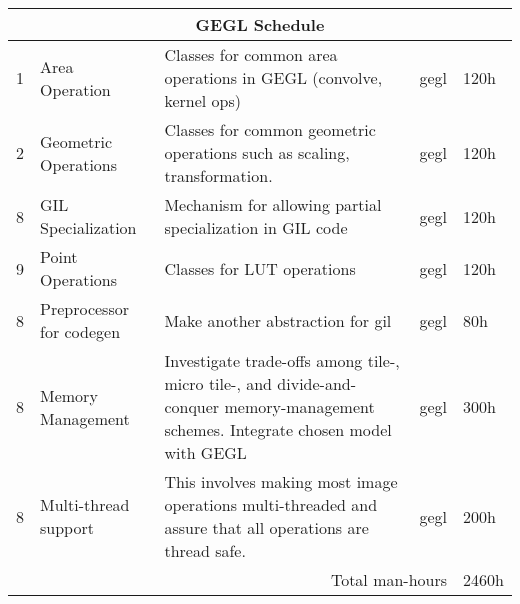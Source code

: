 \begin{flushleft}
\begin{tabular}{|l|p{3cm}|p{5cm}|p{2cm}|l|}
\multicolumn{5}{|c|}{GEGL Schedule}\\
\hline
1 & Area Operation & Classes for common area operations in GEGL (convolve, kernel ops) & gegl & 120h\\
\hline
2 & Geometric Operations & Classes for common geometric operations such as scaling, transformation. & gegl & 120h\\
\hline
8 & GIL Specialization & Mechanism for allowing partial specialization in GIL code & gegl & 120h\\
\hline
9 & Point Operations & Classes for LUT operations & gegl & 120h\\
\hline
8 & Preprocessor for codegen & Make another abstraction for gil & gegl & 80h\\
\hline
8 & Memory Management & Investigate trade-offs among tile-, micro tile-, and divide-and-conquer memory-management schemes. Integrate chosen model with GEGL & gegl & 300h\\
\hline
8 & Multi-thread support & This involves making most image operations multi-threaded and assure that all operations are thread safe. & gegl & 200h\\  
\hline

 
\multicolumn{4}{|r|}{Total man-hours} & 2460h\\
\hline
\end{tabular}
\end{flushleft}

	
